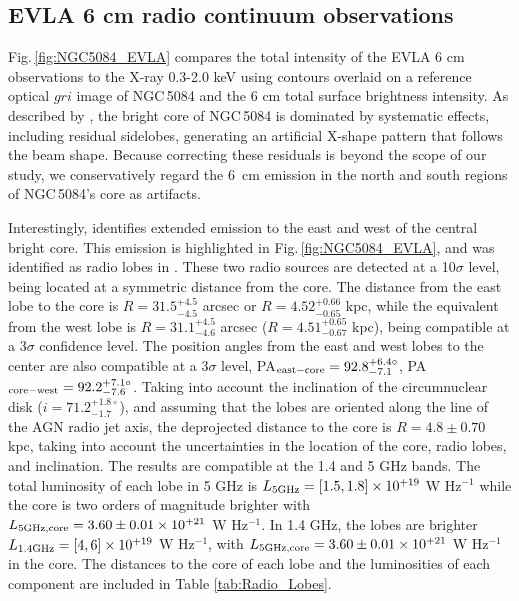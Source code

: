 \documentclass[modern]{CORE-AAS/aastex631}
\begin{document}
 
\subsection{EVLA 6 cm radio continuum observations} \label{subsec:results_radiopol}

Fig.\,\ref{fig:NGC5084_EVLA} compares the total intensity of the EVLA 6 cm observations to the X-ray 0.3-2.0 keV using contours overlaid on a reference optical $gri$ image of NGC\,5084 and the 6 cm total surface brightness intensity. As described by \citet{wiegert+2015aj150_81}, the bright core of NGC\,5084 is dominated by systematic effects, including residual sidelobes, generating an artificial X-shape pattern that follows the beam shape. Because correcting these residuals is beyond the scope of our study, we conservatively regard the 6~cm emission in the north and south regions of NGC\,5084's core as artifacts.


Interestingly, \citet{wiegert+2015aj150_81} identifies extended emission to the east and west of the central bright core. This emission is highlighted in Fig.\,\ref{fig:NGC5084_EVLA}, and was identified as radio lobes in \citet[][see their Table 10]{irwin+2019aj158_21}. These two radio sources are detected at a 10$\sigma$ level, being located at a symmetric distance from the core. The distance from the east lobe to the core is $R=31.5^{+4.5}_{-4.5}$ arcsec or $R=4.52^{+0.66}_{-0.65}$ kpc, while the equivalent from the west lobe is $R=31.1^{+4.5}_{-4.6}$ arcsec ($R=4.51^{+0.65}_{-0.67}$ kpc), being compatible at a 3$\sigma$ confidence level. The position angles from the east and west lobes to the center are also compatible at a 3$\sigma$ level, PA$_{\rm east - core} =92.8^{+6.4\circ}_{-7.1}$, PA$_{\rm core - west} =92.2^{+7.1\circ}_{-7.6}$. Taking into account the inclination of the circumnuclear disk ($i=71.2^{+1.8\circ}_{-1.7}$), and assuming that the lobes are oriented along the line of the AGN radio jet axis, the deprojected distance to the core is $R=4.8\pm0.70$ kpc, taking into account the uncertainties in the location of the core, radio lobes, and inclination. The results are compatible at the 1.4 and 5 GHz bands. The total luminosity of each lobe in 5 GHz is $L_{\rm 5 GHz} = [1.5,1.8] \times 10^{+19}$ W Hz$^{-1}$ while the core is two orders of magnitude brighter with $L_{\rm 5 GHz, core} = 3.60\pm0.01 \times 10^{+21}$ W Hz$^{-1}$. In 1.4 GHz, the lobes are brighter $L_{\rm 1.4 GHz} = [4,6] \times 10^{+19}$ W Hz$^{-1}$, with $L_{\rm 5 GHz, core} = 3.60\pm0.01 \times 10^{+21}$ W Hz$^{-1}$ in the core. The distances to the core of each lobe and the luminosities of each component are included in Table \ref{tab:Radio_Lobes}.  
\end{document}
